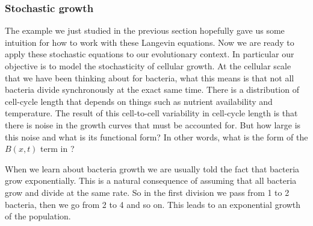 \subsubsection{Stochastic growth}

The example we just studied in the previous section hopefully gave us some
intuition for how to work with these Langevin equations. Now we are ready to
apply these stochastic equations to our evolutionary context. In particular our
objective is to model the stochasticity of cellular growth. At the cellular
scale that we have been thinking about for bacteria, what this means is that
not all bacteria divide synchronously at the exact same time. There is a
distribution of cell-cycle length that depends on things such as nutrient
availability and temperature. The result of this cell-to-cell variability in
cell-cycle length is that there is noise in the growth curves that must be
accounted for. But how large is this noise and what is its functional form? In
other words, what is the form of the $B(x, t)$ term in ?

When we learn about bacteria growth we are usually told the fact that bacteria 
grow exponentially. This is a natural consequence of assuming that all bacteria
grow and divide at the same rate. So in the first division we pass from 1 to 2
bacteria, then we go from 2 to 4 and so on. This leads to an exponential growth
of the population.